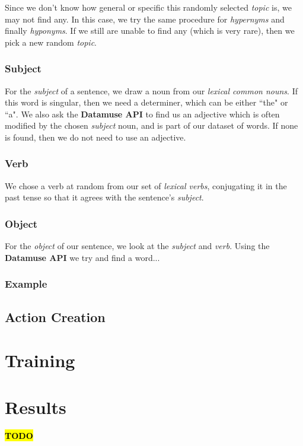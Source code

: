Since we don't know how general or specific this randomly selected \textit{topic} is, we may not find any. In this case, we try the same procedure for \textit{hypernyms} and finally \textit{hyponyms}. If we still are unable to find any (which is very rare), then we pick a new random \textit{topic}.

\subsubsection{Subject}

For the \textit{subject} of a sentence, we draw a noun from our \textit{lexical common nouns}. If this word is singular, then we need a determiner, which can be either ``the" or ``a". We also ask the \textbf{Datamuse API} to find us an adjective which is often modified by the chosen \textit{subject} noun, and is part of our dataset of words. If none is found, then we do not need to use an adjective.

\subsubsection{Verb}

We chose a verb at random from our set of \textit{lexical verbs}, conjugating it in the past tense so that it agrees with the sentence's \textit{subject}.

\subsubsection{Object}

For the \textit{object} of our sentence, we look at the \textit{subject} and \textit{verb}. Using the \textbf{Datamuse API} we try and find a word...

\subsubsection{Example}

\subsection{Action Creation}

\section{Training}

\section{Results}

\textcolor{red}{\textbf{\hl{TODO}}}